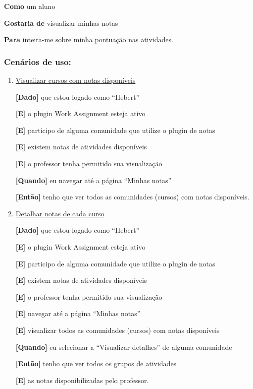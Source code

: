 \begin{enumerate}
\textbf{Como} um aluno

\textbf{Gostaria de} visualizar minhas notas

\textbf{Para} inteira-me sobre minha pontuação nas atividades.

\subsubsection*{Cenários de uso:}
\begin{enumerate}

\item \underline{Visualizar cursos com notas disponíveis}

\textbf{[Dado]} que estou logado como ``Hebert''

\textbf{[E]} o plugin Work Assignment esteja ativo

\textbf{[E]} participo de alguma comunidade que utilize o plugin de notas

\textbf{[E]} existem notas de atividades disponíveis

\textbf{[E]} o professor tenha permitido sua visualização

\textbf{[Quando]} eu navegar até a página ``Minhas notas''

\textbf{[Então]} tenho que ver todos as comunidades (cursos) com notas disponíveis.

\item \underline{Detalhar notas de cada curso}

\textbf{[Dado]} que estou logado como ``Hebert''

\textbf{[E]} o plugin Work Assignment esteja ativo

\textbf{[E]} participo de alguma comunidade que utilize o plugin de notas

\textbf{[E]} existem notas de atividades disponíveis

\textbf{[E]} o professor tenha permitido sua visualização

\textbf{[E]} navegar até a página ``Minhas notas''

\textbf{[E]} visualizar todos as comunidades (cursos) com notas disponíveis

\textbf{[Quando]} eu selecionar a ``Visualizar detalhes'' de alguma comunidade

\textbf{[Então]} tenho que ver todos os grupos de atividades

\textbf{[E]} as notas disponibilizadas pelo professor.
\end{enumerate}
\end{enumerate}